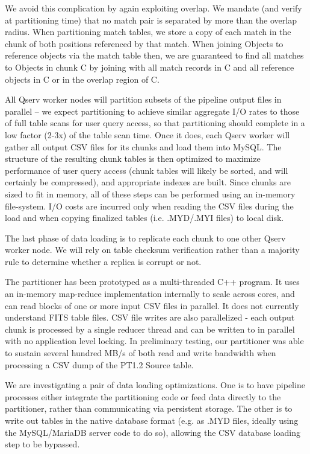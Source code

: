 \documentclass[DM,toc]{lsstdoc}
\begin{document}
We avoid this complication by again exploiting overlap. We mandate (and
verify at partitioning time) that no match pair is separated by more
than the overlap radius. When partitioning match tables, we store a copy
of each match in the chunk of both positions referenced by that match.
When joining Objects to reference objects via the match table then, we
are guaranteed to find all matches to Objects in chunk C by joining with
all match records in C and all reference objects in C or in the overlap
region of C.

All Qserv worker nodes will partition subsets of the pipeline output
files in parallel -- we expect partitioning to achieve similar aggregate
I/O rates to those of full table scans for user query access, so that
partitioning should complete in a low factor (2-3x) of the table scan
time. Once it does, each Qserv worker will gather all output CSV files
for its chunks and load them into MySQL. The structure of the resulting
chunk tables is then optimized to maximize performance of user query
access (chunk tables will likely be sorted, and will certainly be
compressed), and appropriate indexes are built. Since chunks are sized
to fit in memory, all of these steps can be performed using an in-memory
file-system. I/O costs are incurred only when reading the CSV files
during the load and when copying finalized tables (i.e. .MYD/.MYI files)
to local disk.

The last phase of data loading is to replicate each chunk to one other
Qserv worker node. We will rely on table checksum verification rather
than a majority rule to determine whether a replica is corrupt or not.

The partitioner has been prototyped as a multi-threaded C++ program. It
uses an in-memory map-reduce implementation internally to scale across
cores, and can read blocks of one or more input CSV files in parallel.
It does not currently understand FITS table files. CSV file writes are
also parallelized - each output chunk is processed by a single reducer
thread and can be written to in parallel with no application level
locking. In preliminary testing, our partitioner was able to sustain
several hundred MB/s of both read and write bandwidth when processing a
CSV dump of the PT1.2 Source table.

We are investigating a pair of data loading optimizations. One is to
have pipeline processes either integrate the partitioning code or feed
data directly to the partitioner, rather than communicating via
persistent storage. The other is to write out tables in the native
database format (e.g. as .MYD files, ideally using the MySQL/MariaDB
server code to do so), allowing the CSV database loading step to be
bypassed.
\end{document}
